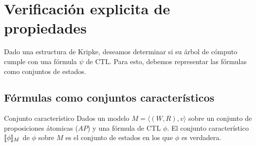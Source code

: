 \section{Verificación explicita de propiedades}
Dado una estructura de Kripke, deseamos determinar si su árbol de cómputo cumple con una fórmula $\psi$ de CTL. Para esto, debemos representar las fórmulas como conjuntos de estados.

\subsection{Fórmulas como conjuntos característicos}\label{sec::conjuntoCaracteristicos}
\begin{definicion}{Conjunto característico}
Dados un modelo $M = \langle(W,R), v\rangle$ sobre un conjunto de proposiciones átomicas ($AP$) y una fórmula de CTL $\phi$. El conjunto característico $\llbracket \phi \rrbracket_{M}$ de $\phi$ sobre $M$ es el conjunto de estados en los que $\phi$ es verdadera.
\end{definicion}


